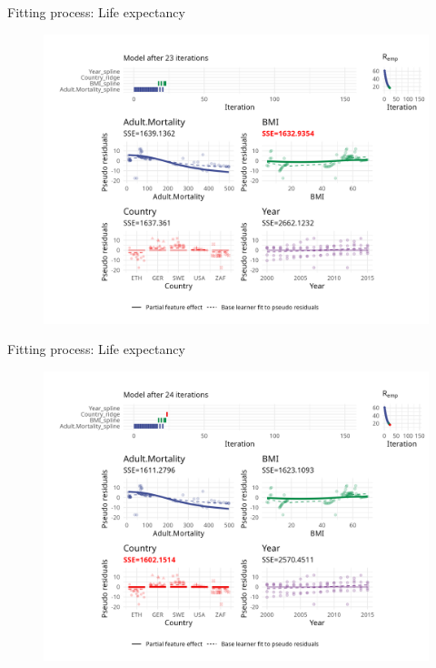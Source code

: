 \begin{frame}{Fitting process: Life expectancy}
	\begin{figure}
		\centering
		\includegraphics[width=\textwidth]{figures/cwb-anim/fig-iter-0023.png}
	\end{figure}
	\addtocounter{framenumber}{-1}
\end{frame}


\begin{frame}{Fitting process: Life expectancy}
	\begin{figure}
		\centering
		\includegraphics[width=\textwidth]{figures/cwb-anim/fig-iter-0024.png}
	\end{figure}
	\addtocounter{framenumber}{-1}
\end{frame}


